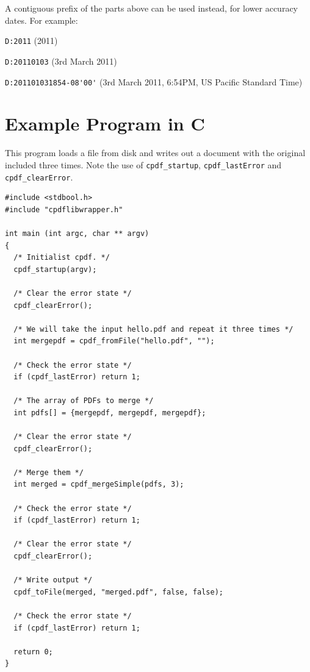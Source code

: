 \documentclass[a4paper]{memoir}
\begin{document}
\noindent A contiguous prefix of the parts above can be used instead, for lower
accuracy dates. For example:

\begin{framed}
   \small\noindent\verb!D:2011! (2011)
   
   \vspace{1.5mm}
   \noindent\verb!D:20110103! (3rd March 2011)

   \vspace{1.5mm}
   \noindent\verb!D:201101031854-08'00'! (3rd March 2011, 6:54PM, US Pacific Standard Time)
   
\end{framed}
\chapter{Example Program in C}
This program loads a file from disk and writes out a document with the original included three times. Note the use of \texttt{cpdf\_startup}, \texttt{cpdf\_lastError} and \texttt{cpdf\_clearError}.

\begin{small}
\begin{verbatim}
#include <stdbool.h>
#include "cpdflibwrapper.h"

int main (int argc, char ** argv)
{
  /* Initialist cpdf. */
  cpdf_startup(argv);

  /* Clear the error state */
  cpdf_clearError();

  /* We will take the input hello.pdf and repeat it three times */
  int mergepdf = cpdf_fromFile("hello.pdf", "");

  /* Check the error state */
  if (cpdf_lastError) return 1;

  /* The array of PDFs to merge */
  int pdfs[] = {mergepdf, mergepdf, mergepdf};

  /* Clear the error state */
  cpdf_clearError();

  /* Merge them */
  int merged = cpdf_mergeSimple(pdfs, 3);
  
  /* Check the error state */
  if (cpdf_lastError) return 1;

  /* Clear the error state */
  cpdf_clearError();

  /* Write output */
  cpdf_toFile(merged, "merged.pdf", false, false);

  /* Check the error state */
  if (cpdf_lastError) return 1;

  return 0;
}
\end{verbatim}
\end{small}

\backmatter
\end{document}
